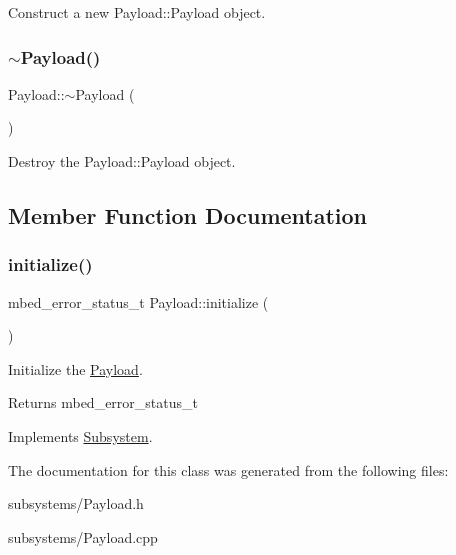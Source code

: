 Construct a new Payload\+::\+Payload object. 

\mbox{\label{class_payload_ae391ae4ea0e160ee9dd58c559bbf74f7}} 
\subsubsection{\texorpdfstring{$\sim$Payload()}{~Payload()}}
{\footnotesize\ttfamily Payload\+::$\sim$\+Payload (\begin{DoxyParamCaption}{ }\end{DoxyParamCaption})}



Destroy the Payload\+::\+Payload object. 



\subsection{Member Function Documentation}
\mbox{\label{class_payload_aa55a2da734e6950391d73b0837bbd3b9}} 
\subsubsection{\texorpdfstring{initialize()}{initialize()}}
{\footnotesize\ttfamily mbed\+\_\+error\+\_\+status\+\_\+t Payload\+::initialize (\begin{DoxyParamCaption}{ }\end{DoxyParamCaption})\hspace{0.3cm}{\ttfamily [virtual]}}



Initialize the \mbox{\hyperlink{class_payload}{Payload}}. 

\begin{DoxyReturn}{Returns}
mbed\+\_\+error\+\_\+status\+\_\+t 
\end{DoxyReturn}


Implements \mbox{\hyperlink{class_subsystem_afa43e7c1c8b49e514b944f517d4dc905}{Subsystem}}.



The documentation for this class was generated from the following files\+:\begin{DoxyCompactItemize}
\item 
subsystems/Payload.\+h\item 
subsystems/Payload.\+cpp\end{DoxyCompactItemize}
